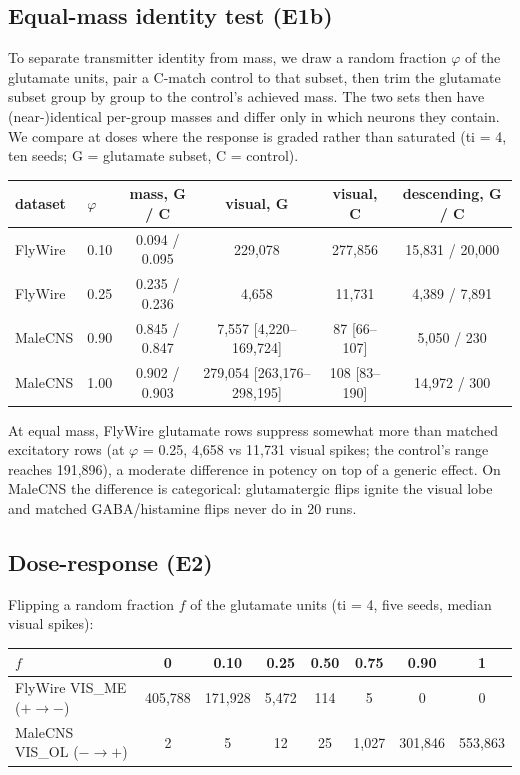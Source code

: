 \documentclass[11pt,a4paper]{article}
\begin{document}
\subsection{Equal-mass identity test (E1b)}

To separate transmitter identity from mass, we draw a random fraction $\varphi$
of the glutamate units, pair a C-match control to that subset, then trim the
glutamate subset group by group to the control's achieved mass. The two sets
then have (near-)identical per-group masses and differ only in which
neurons they contain. We compare at doses where the response is graded
rather than saturated (ti = 4, ten seeds; G = glutamate subset, C = control).

\begin{center}
\footnotesize
\setlength{\tabcolsep}{4pt}
\begin{tabular}{llcccc}
\toprule
dataset & $\varphi$ & mass, G / C & visual, G & visual, C & descending, G / C \\
\midrule
FlyWire & 0.10 & 0.094 / 0.095 & 229,078 & 277,856 & 15,831 / 20,000 \\
FlyWire & 0.25 & 0.235 / 0.236 & 4,658 & 11,731 & 4,389 / 7,891 \\
MaleCNS & 0.90 & 0.845 / 0.847 & 7,557 [4,220--169,724] & 87 [66--107] & 5,050 / 230 \\
MaleCNS & 1.00 & 0.902 / 0.903 & 279,054 [263,176--298,195] & 108 [83--190] & 14,972 / 300 \\
\bottomrule
\end{tabular}
\end{center}

At equal mass, FlyWire glutamate rows suppress somewhat more than matched
excitatory rows (at $\varphi$ = 0.25, 4,658 vs 11,731 visual spikes; the
control's range reaches 191,896), a moderate difference in potency on top of a
generic effect. On MaleCNS the difference is categorical: glutamatergic flips
ignite the visual lobe and matched GABA/histamine flips never do in 20 runs.

\subsection{Dose-response (E2)}

Flipping a random fraction $f$ of the glutamate units (ti = 4, five seeds,
median visual spikes):

\begin{center}
\footnotesize
\begin{tabular}{lccccccc}
\toprule
$f$ & 0 & 0.10 & 0.25 & 0.50 & 0.75 & 0.90 & 1 \\
\midrule
FlyWire VIS\_ME ($+\to-$) & 405,788 & 171,928 & 5,472 & 114 & 5 & 0 & 0 \\
MaleCNS VIS\_OL ($-\to+$) & 2 & 5 & 12 & 25 & 1,027 & 301,846 & 553,863 \\
\bottomrule
\end{tabular}
\end{center}
\end{document}
